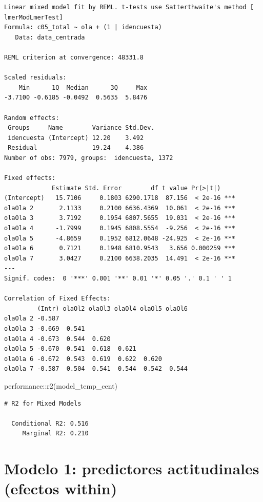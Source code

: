 \documentclass[
  spanish,
  a4paper,
  oneside]{scrbook}
\newenvironment{Shaded}{\begin{snugshade}}{\end{snugshade}}
\newcommand{\FunctionTok}[1]{\textcolor[rgb]{0.28,0.35,0.67}{#1}}
\newcommand{\NormalTok}[1]{\textcolor[rgb]{0.00,0.23,0.31}{#1}}
\newcommand{\SpecialCharTok}[1]{\textcolor[rgb]{0.37,0.37,0.37}{#1}}
\begin{document}
\begin{verbatim}
Linear mixed model fit by REML. t-tests use Satterthwaite's method [
lmerModLmerTest]
Formula: c05_total ~ ola + (1 | idencuesta)
   Data: data_centrada

REML criterion at convergence: 48331.8

Scaled residuals: 
    Min      1Q  Median      3Q     Max 
-3.7100 -0.6185 -0.0492  0.5635  5.8476 

Random effects:
 Groups     Name        Variance Std.Dev.
 idencuesta (Intercept) 12.20    3.492   
 Residual               19.24    4.386   
Number of obs: 7979, groups:  idencuesta, 1372

Fixed effects:
             Estimate Std. Error        df t value Pr(>|t|)    
(Intercept)   15.7106     0.1803 6290.1718  87.156  < 2e-16 ***
olaOla 2       2.1133     0.2100 6636.4369  10.061  < 2e-16 ***
olaOla 3       3.7192     0.1954 6807.5655  19.031  < 2e-16 ***
olaOla 4      -1.7999     0.1945 6808.5554  -9.256  < 2e-16 ***
olaOla 5      -4.8659     0.1952 6812.0648 -24.925  < 2e-16 ***
olaOla 6       0.7121     0.1948 6810.9543   3.656 0.000259 ***
olaOla 7       3.0427     0.2100 6638.2035  14.491  < 2e-16 ***
---
Signif. codes:  0 '***' 0.001 '**' 0.01 '*' 0.05 '.' 0.1 ' ' 1

Correlation of Fixed Effects:
         (Intr) olaOl2 olaOl3 olaOl4 olaOl5 olaOl6
olaOla 2 -0.587                                   
olaOla 3 -0.669  0.541                            
olaOla 4 -0.673  0.544  0.620                     
olaOla 5 -0.670  0.541  0.618  0.621              
olaOla 6 -0.672  0.543  0.619  0.622  0.620       
olaOla 7 -0.587  0.504  0.541  0.544  0.542  0.544
\end{verbatim}

\begin{Shaded}
\begin{Highlighting}[]
\NormalTok{performance}\SpecialCharTok{::}\FunctionTok{r2}\NormalTok{(model\_temp\_cent)}
\end{Highlighting}
\end{Shaded}

\begin{verbatim}
# R2 for Mixed Models

  Conditional R2: 0.516
     Marginal R2: 0.210
\end{verbatim}

\section{Modelo 1: predictores actitudinales (efectos
within)}\label{modelo-1-predictores-actitudinales-efectos-within}
\end{document}
